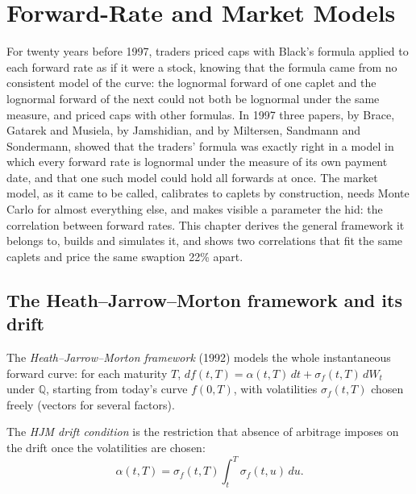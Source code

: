 \chapter{Forward-Rate and Market Models}\label{ch:rc:forward-rate-and-market-models}

For twenty years before 1997, traders priced caps with Black's formula applied
to each forward rate as if it were a stock, knowing that the formula came from
no consistent model of the curve: the lognormal forward of one caplet and the
lognormal forward of the next could not both be lognormal under the same
measure, and  priced caps with other formulas. In 1997 three
papers, by Brace, Gatarek and Musiela, by Jamshidian, and by Miltersen,
Sandmann and Sondermann, showed that the traders' formula was exactly right in
a model in which every forward rate is lognormal under the measure of its own
payment date, and that one such model could hold all forwards at once. The
market model, as it came to be called, calibrates to caplets by construction,
needs Monte Carlo for almost everything else, and makes visible a parameter the
 hid: the correlation between forward rates. This chapter
derives the general framework it belongs to, builds and simulates it, and shows
two correlations that fit the same caplets and price the same swaption 22\%
apart.

\section{The Heath--Jarrow--Morton framework and its drift}

\begin{definition}\label{def:rc:forward-rate-and-market-models:hjm}
The \emph{Heath--Jarrow--Morton framework}
(1992) models the whole instantaneous forward curve: for each maturity $T$,
$df(t,T) = \alpha(t,T)\,dt+\sigma_f(t,T)\,dW_t$ under $\mathbb Q$, starting from
today's curve $f(0,T)$, with volatilities $\sigma_f(t,T)$ chosen freely (vectors
for several factors).
\end{definition}

\begin{definition}\label{def:rc:forward-rate-and-market-models:drift}
The \emph{HJM drift condition} is the restriction
that absence of arbitrage imposes on the drift once the volatilities are
chosen:
\[
\alpha(t,T) = \sigma_f(t,T)\int_t^T\sigma_f(t,u)\,du .
\]
\end{definition}

